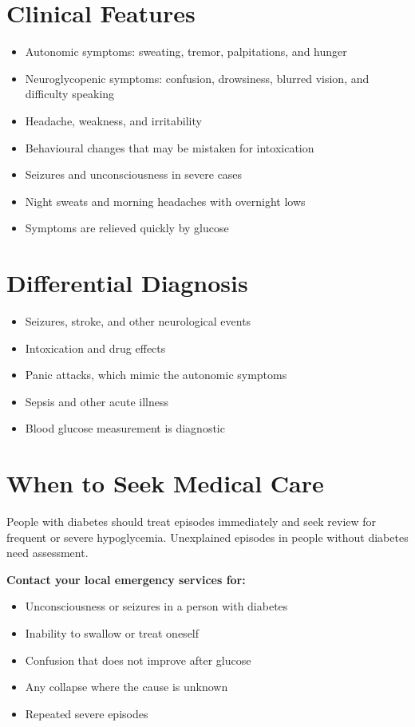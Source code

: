 \section*{Clinical Features}
\begin{itemize}
    \item Autonomic symptoms: sweating, tremor, palpitations, and hunger
    \item Neuroglycopenic symptoms: confusion, drowsiness, blurred vision, and difficulty speaking
    \item Headache, weakness, and irritability
    \item Behavioural changes that may be mistaken for intoxication
    \item Seizures and unconsciousness in severe cases
    \item Night sweats and morning headaches with overnight lows
    \item Symptoms are relieved quickly by glucose
\end{itemize}

\section*{Differential Diagnosis}
\begin{itemize}
    \item Seizures, stroke, and other neurological events
    \item Intoxication and drug effects
    \item Panic attacks, which mimic the autonomic symptoms
    \item Sepsis and other acute illness
    \item Blood glucose measurement is diagnostic
\end{itemize}

\section*{When to Seek Medical Care}
People with diabetes should treat episodes immediately and seek review for frequent or severe hypoglycemia. Unexplained episodes in people without diabetes need assessment.

\textbf{Contact your local emergency services for:}
\begin{itemize}
    \item Unconsciousness or seizures in a person with diabetes
    \item Inability to swallow or treat oneself
    \item Confusion that does not improve after glucose
    \item Any collapse where the cause is unknown
    \item Repeated severe episodes
\end{itemize}

